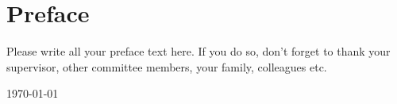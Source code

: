 \chapter*{Preface}
\label{ch:preface}

Please write all your preface text here.
If you do so, don't forget to thank your supervisor, other committee members, your family, colleagues etc.

\today